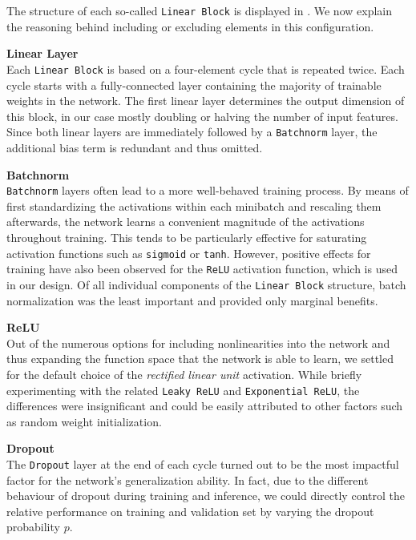 The structure of each so-called \texttt{Linear Block} is displayed in .
We now explain the reasoning behind including or excluding elements in this configuration.

\textbf{Linear Layer} \\
Each \texttt{Linear Block} is based on a four-element cycle that is repeated twice.
Each cycle starts with a fully-connected layer containing the majority of trainable weights in the network.
The first linear layer determines the output dimension of this block, in our case mostly doubling or halving the number of input features.
Since both linear layers are immediately followed by a \texttt{Batchnorm} layer, the additional bias term is redundant and thus omitted.

\textbf{Batchnorm} \\
\texttt{Batchnorm} layers \citep{ioffe2015} often lead to a more well-behaved training process.
By means of first standardizing the activations within each minibatch and rescaling them afterwards, the network learns a convenient magnitude of the activations throughout training.
This tends to be particularly effective for saturating activation functions such as \texttt{sigmoid} or \texttt{tanh}. However, positive effects for training have also been observed for the \texttt{ReLU} activation function, which is used in our design.
Of all individual components of the \texttt{Linear Block} structure, batch normalization was the least important and provided only marginal benefits.

\textbf{ReLU} \\
Out of the numerous options for including nonlinearities into the network and thus expanding the function space that the network is able to learn, we settled for the default choice of the \emph{rectified linear unit} activation.
While briefly experimenting with the related \texttt{Leaky ReLU} and \texttt{Exponential ReLU}, the differences were insignificant and could be easily attributed to other factors such as random weight initialization.

\textbf{Dropout} \label{dropout} \\
The \texttt{Dropout} layer \citep{srivastava2014} at the end of each cycle turned out to be the most impactful factor for the network's generalization ability.
In fact, due to the different behaviour of dropout during training and inference, we could directly control the relative performance on training and validation set by varying the dropout probability $p$.


